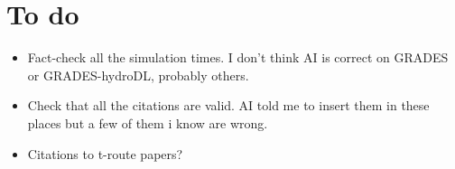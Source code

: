 \section*{To do}
\begin{itemize}
  \item Fact-check all the simulation times. I don't think AI is correct on GRADES or GRADES-hydroDL, probably others.
  \item Check that all the citations are valid. AI told me to insert them in these places but a few of them i know are wrong.
  \item Citations to t-route papers?
\end{itemize}
\clearpage
